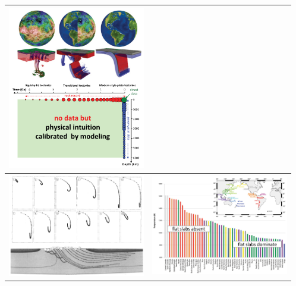\begin{tabular}{p{8cm}p{8cm}}
\includegraphics[width=6cm]{images/beautiful/gery19} \cite{gery19}\\ \hline
\includegraphics[width=6cm]{images/beautiful/babr97} \cite{babr97} & 
\includegraphics[width=6cm]{images/beautiful/kifr15} \cite{kifr15}  \\ \hline
\end{tabular}

